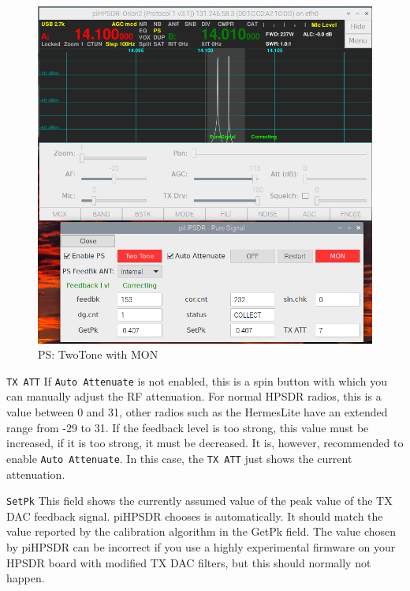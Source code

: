 \documentclass[12pt]{book}
\def\rett#1{\texttt{\color{red}#1}}
\begin{document}
\begin{figure}[t!]
\center
\includegraphics[width=12cm]{PSmon.png}
\caption{PS: TwoTone with MON}
\label{fig:PSmon}
\end{figure}

\rett{TX ATT} If \rett{Auto Attenuate} is not enabled, this is a spin button with which
you can manually adjust the RF attenuation. For normal HPSDR radios, this is a value
between 0 and 31, other radios such as the HermesLite have an extended range from
-29 to 31. If the feedback level is too strong, this value must be increased, if it
is too strong, it must be decreased. It is, however, recommended to enable \rett{Auto Attenuate}.
In this case, the \rett{TX ATT} just shows the current attenuation.

\rett{SetPk} This field shows the currently assumed value of the peak value of the TX DAC
feedback signal. piHPSDR chooses is automatically. It should match the value reported
by the calibration algorithm in the GetPk field. The  value
chosen by piHPSDR can be incorrect if you use a highly experimental firmware on your
HPSDR board with modified TX DAC filters, but this should normally not happen.
\end{document}
